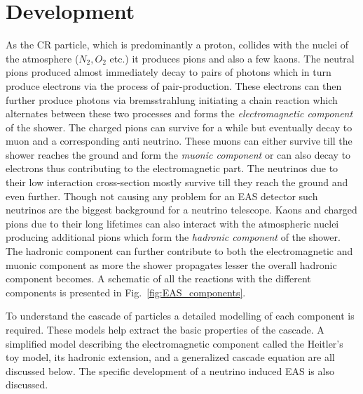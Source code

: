 \section{Development}
\label{sec:EAS_dev}

As the CR particle, which is predominantly a proton, collides with the nuclei of the atmosphere ($N_2, O_2 $ etc.) it produces pions and also a few kaons. The neutral pions produced almost immediately decay to pairs of photons which in turn produce electrons via the process of pair-production. These electrons can then further produce photons via bremsstrahlung initiating a chain reaction which alternates between these two processes and forms the \textit{electromagnetic component} of the shower. The charged pions can survive for a while but eventually decay to muon and a corresponding anti neutrino. These muons can either survive till the shower reaches the ground and form the \textit{muonic component} or can also decay to electrons thus contributing to the electromagnetic part. The neutrinos due to their low interaction cross-section mostly survive till they reach the ground and even further. Though not causing any problem for an EAS detector such neutrinos are the biggest background for a neutrino telescope. Kaons and charged pions due to their long lifetimes can also interact with the atmospheric nuclei producing additional pions which form the \textit{hadronic component} of the shower. The hadronic component can further contribute to both the electromagnetic and muonic component as more the shower propagates lesser the overall hadronic component becomes. A schematic of all the reactions with the different components is presented in Fig.~\ref{fig:EAS_components}.

To understand the cascade of particles a detailed modelling of each component is required. These models help extract the basic properties of the cascade. A simplified model describing the electromagnetic component called the Heitler's toy model, its hadronic extension, and a generalized cascade equation are all discussed below. The specific development of a neutrino induced EAS is also discussed.  

